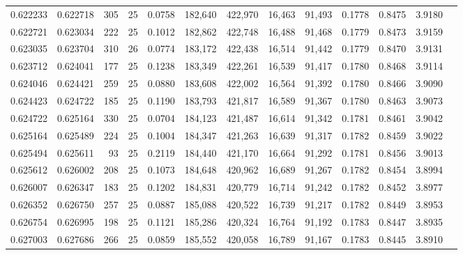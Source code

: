\begin{tabular}{rrrrrrrrrrrrr}
0.622233 & 0.622718 &   305 &  25 &                                     0.0758 & 182,640 & 422,970 &  16,463 &  91,493 & 0.1778 & 0.8475 & 3.9180 \\
0.622721 & 0.623034 &   222 &  25 &                                     0.1012 & 182,862 & 422,748 &  16,488 &  91,468 & 0.1779 & 0.8473 & 3.9159 \\
0.623035 & 0.623704 &   310 &  26 &                                     0.0774 & 183,172 & 422,438 &  16,514 &  91,442 & 0.1779 & 0.8470 & 3.9131 \\
0.623712 & 0.624041 &   177 &  25 &                                     0.1238 & 183,349 & 422,261 &  16,539 &  91,417 & 0.1780 & 0.8468 & 3.9114 \\
0.624046 & 0.624421 &   259 &  25 &                                     0.0880 & 183,608 & 422,002 &  16,564 &  91,392 & 0.1780 & 0.8466 & 3.9090 \\
0.624423 & 0.624722 &   185 &  25 &                                     0.1190 & 183,793 & 421,817 &  16,589 &  91,367 & 0.1780 & 0.8463 & 3.9073 \\
0.624722 & 0.625164 &   330 &  25 &                                     0.0704 & 184,123 & 421,487 &  16,614 &  91,342 & 0.1781 & 0.8461 & 3.9042 \\
0.625164 & 0.625489 &   224 &  25 &                                     0.1004 & 184,347 & 421,263 &  16,639 &  91,317 & 0.1782 & 0.8459 & 3.9022 \\
0.625494 & 0.625611 &    93 &  25 &                                     0.2119 & 184,440 & 421,170 &  16,664 &  91,292 & 0.1781 & 0.8456 & 3.9013 \\
0.625612 & 0.626002 &   208 &  25 &                                     0.1073 & 184,648 & 420,962 &  16,689 &  91,267 & 0.1782 & 0.8454 & 3.8994 \\
0.626007 & 0.626347 &   183 &  25 &                                     0.1202 & 184,831 & 420,779 &  16,714 &  91,242 & 0.1782 & 0.8452 & 3.8977 \\
0.626352 & 0.626750 &   257 &  25 &                                     0.0887 & 185,088 & 420,522 &  16,739 &  91,217 & 0.1782 & 0.8449 & 3.8953 \\
0.626754 & 0.626995 &   198 &  25 &                                     0.1121 & 185,286 & 420,324 &  16,764 &  91,192 & 0.1783 & 0.8447 & 3.8935 \\
0.627003 & 0.627686 &   266 &  25 &                                     0.0859 & 185,552 & 420,058 &  16,789 &  91,167 & 0.1783 & 0.8445 & 3.8910 \\

\end{tabular}
